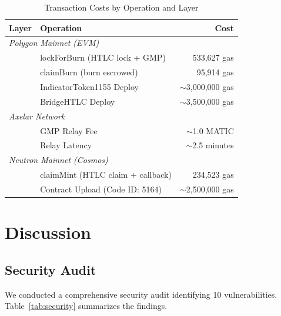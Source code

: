 \documentclass[conference,10pt]{IEEEtran}
\begin{document}
\begin{table}[t]
\centering
\caption{Transaction Costs by Operation and Layer}
\label{tab:gas}
\footnotesize
\begin{tabular}{@{}llr@{}}
\toprule
\textbf{Layer} & \textbf{Operation} & \textbf{Cost} \\
\midrule
\multicolumn{3}{l}{\textit{Polygon Mainnet (EVM)}} \\
& lockForBurn (HTLC lock + GMP) & 533,627 gas \\
& claimBurn (burn escrowed) & 95,914 gas \\
& IndicatorToken1155 Deploy & $\sim$3,000,000 gas \\
& BridgeHTLC Deploy & $\sim$3,500,000 gas \\
\midrule
\multicolumn{3}{l}{\textit{Axelar Network}} \\
& GMP Relay Fee & $\sim$1.0 MATIC \\
& Relay Latency & $\sim$2.5 minutes \\
\midrule
\multicolumn{3}{l}{\textit{Neutron Mainnet (Cosmos)}} \\
& claimMint (HTLC claim + callback) & 234,523 gas \\
& Contract Upload (Code ID: 5164) & $\sim$2,500,000 gas \\
\bottomrule
\end{tabular}
\end{table}

\section{Discussion}
\label{sec:discussion}

\subsection{Security Audit}

We conducted a comprehensive security audit identifying 10 vulnerabilities. Table~\ref{tab:security} summarizes the findings.
\end{document}
